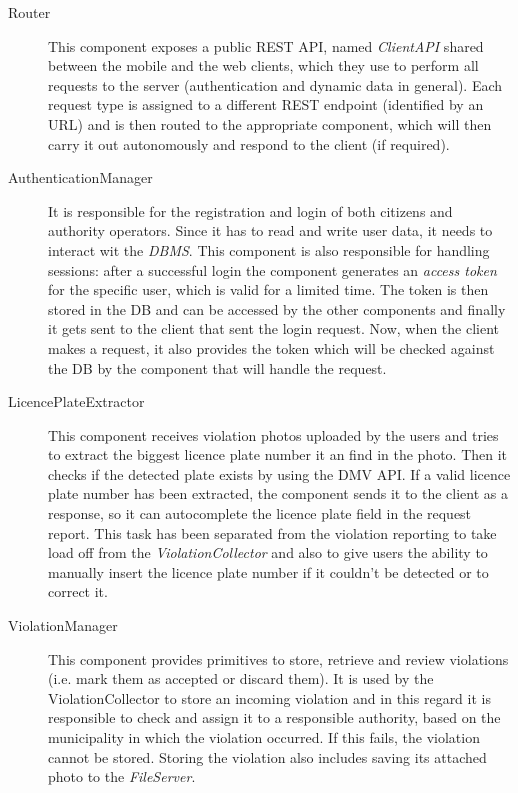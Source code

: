 \begin{description}
    \item[Router] This component exposes a public REST API, named
    \emph{ClientAPI} shared between the mobile and the web clients, which they
    use to perform all requests to the server (authentication and dynamic data
    in general). Each request type is assigned to a different REST endpoint
    (identified by an URL) and is then routed to the appropriate component,
    which will then carry it out autonomously and respond to the client
    (if required).
    \item[AuthenticationManager] It is responsible for the registration and
    login of both citizens and authority operators. Since it has to read and
    write user data, it needs to interact wit the \emph{DBMS}.
    This component is also responsible for handling sessions: after a successful
    login the component generates an \emph{access token} for the specific user,
    which is valid for a limited time. The token is then stored in the DB
    and can be accessed by the other components and finally it gets sent to the
    client that sent the login request.
    Now, when the client makes a request, it also provides the token which will
    be checked against the DB by the component that will handle the request.
    \item[LicencePlateExtractor] This component receives violation photos
    uploaded by the users and tries to extract the biggest licence plate
    number it an find in the photo. Then it checks if the detected plate exists
    by using the DMV API. If a valid licence plate number has been extracted,
    the component sends it to the client as a response, so it can autocomplete
    the licence plate field in the request report.
    This task has been separated from the violation reporting to take load
    off from the \emph{ViolationCollector} and also to give users the ability
    to manually insert the licence plate number if it couldn't be detected or
    to correct it.
    \item[ViolationManager] This component provides primitives to store,
    retrieve and review violations (i.e. mark them as accepted or discard them).
    It is used by the ViolationCollector to store an incoming violation and in
    this regard it is responsible to check and assign it to a responsible
    authority, based on the municipality in which the violation occurred. If
    this fails, the violation cannot be stored. Storing the violation also
    includes saving its attached photo to the \emph{FileServer}.

\end{description}
